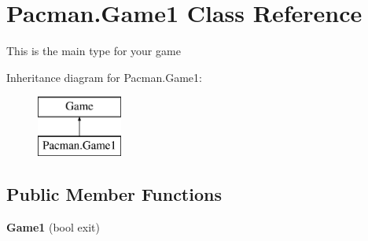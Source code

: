 \hypertarget{class_pacman_1_1_game1}{\section{Pacman.\-Game1 Class Reference}
\label{class_pacman_1_1_game1}
}


This is the main type for your game  


Inheritance diagram for Pacman.\-Game1\-:\begin{figure}[H]
\begin{center}
\leavevmode
\includegraphics[height=2.000000cm]{class_pacman_1_1_game1}
\end{center}
\end{figure}
\subsection*{Public Member Functions}
\begin{DoxyCompactItemize}
\item 
\hypertarget{class_pacman_1_1_game1_a06dfb68d52150fb8f15f7d739947b7ac}{{\bfseries Game1} (bool exit)}\label{class_pacman_1_1_game1_a06dfb68d52150fb8f15f7d739947b7ac}

\end{DoxyCompactItemize}
